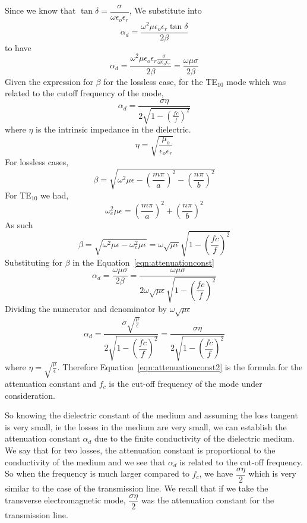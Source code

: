 Since we know that $\tan\delta = \dfrac{\sigma}{\omega\epsilon_{o}\epsilon_{r}}$, We substitute into 
$$\alpha_{d} = \dfrac{\omega^{2}\mu\epsilon_{o}\epsilon_{r}\tan\delta}{2\beta}$$ 
to have 
\begin{dmath}
\alpha_{d} = \dfrac{\omega^{2}\mu\epsilon_{o}\epsilon_{r}\frac{\sigma}{\omega\epsilon_{o}\epsilon_{r}}}{2\beta} = \dfrac{\omega\mu\sigma}{2\beta}
\label{eqn:attenuationconst}
\end{dmath}
Given the expression for $\beta$ for the lossless case, for the TE$_{10}$ mode which was related to the cutoff frequency of the mode, 
$$
\alpha_{d} =  \frac{\sigma\eta}{2\sqrt{1-(\frac{fc}{f})^{2}}}
$$
where $\eta$ is the intrinsic impedance in the dielectric.
$$	
\eta =  \sqrt{\frac{\mu_{o}}{\epsilon_{o}\epsilon_{r}}}
$$
For lossless cases, 
$$\beta = \sqrt{\omega^{2}\mu\epsilon-\left(\dfrac{m\pi}{a}\right)^{2}-\left(\dfrac{n\pi}{b}\right)^{2}}$$
For TE$_{10}$ we had, $$\omega^{2}_{c}\mu\epsilon = \left(\dfrac{m\pi}{a}\right)^{2}+\left(\dfrac{n\pi}{b}\right)^{2}$$	
As such 
\begin{dmath*}
\beta = \sqrt{\omega^{2}\mu\epsilon-\omega^{2}_{c}\mu\epsilon} = \omega\sqrt{\mu\epsilon}\sqrt{1-\left(\dfrac{fc}{f}\right)^{2}}
\end{dmath*}
Substituting for $\beta$ in the Equation~\ref{eqn:attenuationconst}
\begin{dmath*}	
\alpha_{d}=\dfrac{\omega\mu\sigma}{2\beta}= \dfrac{\omega\mu\sigma}{2\omega\sqrt{\mu\epsilon}\sqrt{1-\left(\dfrac{fc}{f}\right)^{2}}}
\end{dmath*}
Dividing the numerator and denominator by $\omega\sqrt{\mu\epsilon}$
\begin{dmath}
\alpha_{d} = \dfrac{\sigma\sqrt{\frac{\mu}{\epsilon}}}{2\sqrt{1-\left(\dfrac{fc}{f}\right)^{2}}}=\dfrac{\sigma\eta}{2\sqrt{1 - \left(\dfrac{fc}{f}\right)^{2}}}
\label{eqn:attenuationconst2}
\end{dmath}
where $\eta= \sqrt{\frac{\mu}{\epsilon}}$. Therefore Equation~\ref{eqn:attenuationconst2} is the formula for the attenuation constant and $f_c$ is the cut-off frequency of the mode under consideration.

So knowing the dielectric constant of the medium and assuming the loss tangent is very small, ie the losses in the medium are very small, we can establish the attenuation constant $\alpha_{d}$ due to the finite conductivity of the dielectric medium. We say that for two losses, the attenuation constant is proportional to the conductivity of the medium and we see that $\alpha_{d}$ is related to the cut-off frequency. So when the frequency is much larger compared to $f_{c}$, we have $\dfrac{\sigma\eta}{2}$ which is very similar to the case of the transmission line. We recall that if we take the transverse electromagnetic mode, $\dfrac{\sigma\eta}{2}$ was the attenuation constant for the transmission line.

